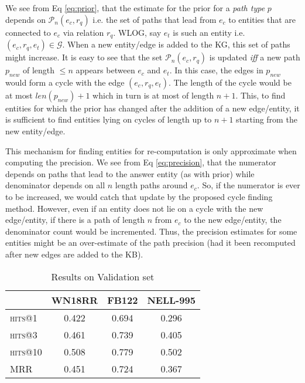 \documentclass[11pt,a4paper]{article}
\newcommand{\nell}{NELL-995\xspace}
\begin{document}
We see from Eq \ref{eq:prior}, that the estimate for the prior for a \textit{path type} $p$ depends on $\mathcal{P}_{n}(e_c, r_q)$ i.e. the set of paths that lead from $e_c$ to entities that are connected to $e_c$ via relation $r_q$. WLOG, say $e_t$ is such an entity i.e. $(e_c, r_q, e_t) \in \mathcal{G}$. When a new entity/edge is added to the KG, this set of paths might increase. It is easy to see that the set $\mathcal{P}_{n}(e_c, r_q)$ is updated \textit{iff} a new path $p_{new}$ of length $\leq n$ appears between $e_c$ and $e_t$. In this case, the edges in $p_{new}$ would form a cycle with the edge $(e_c, r_q, e_t)$. The length of the cycle would be at most $len(p_{new}) + 1$ which in turn is at most of length $n+1$. This, to find entities for which the prior has changed after the addition of a new edge/entity, it is sufficient to find entities lying on cycles of length up to $n+1$ starting from the new entity/edge.

This mechanism for finding entities for re-computation is only approximate when computing the precision. We see from Eq \ref{eq:precision}, that the numerator depends on paths that lead to the answer entity (as with prior) while denominator depends on all $n$ length paths around $e_c$. So, if the numerator is ever to be increased, we would catch that update by the proposed cycle finding method. However, even if an entity does not lie on a cycle with the new edge/entity, if there is a path of length $n$ from $e_c$ to the new edge/entity, the denominator count would be incremented. Thus, the precision estimates for some entities might be an over-estimate of the path precision (had it been recomputed after new edges are added to the KB).



\begin{table}
\centering
\small
\begin{tabular}{ l  c c c}
\toprule
& \textbf{WN18RR} & \textbf{FB122} & \textbf{\nell}  \\ 
\midrule
  \textsc{hits}@1 & 0.422 & 0.694 & 0.296\\
  \textsc{hits}@3  & 0.461 & 0.739 & 0.405\\
  \textsc{hits}@10  & 0.508 & 0.779 & 0.502\\
  \textsc{MRR}   & 0.451 & 0.724 & 0.367\\
\bottomrule
\end{tabular}
\caption{Results on Validation set}
\label{tab:validation_results}
\end{table}
\end{document}
